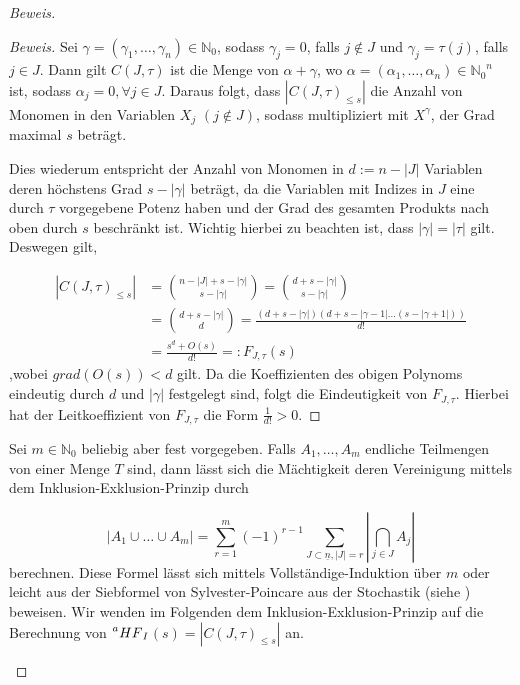 \documentclass{article}
\newcommand*{\indx}[2]{{#1}_{#2}}
\newcommand*{\potx}[2]{{#1}^{#2}}
\newcommand*{\N}{\mathbb{N}_0}
\newcommand*{\hf}[1]{$\prescript{a}{}{HF}_{#1}$}
\begin{document}
\begin{proof}[Beweis]
\begin{compactenum}
\begin{proof}[Beweis]
	Sei $\gamma=(\indx{\gamma}{1},\ldots,\indx{\gamma}{n}) \in \N$, sodass $\indx{\gamma}{j}=0$, falls $j\notin J$ und $\indx{\gamma}{j}=\tau(j)$, falls $j\in J$. Dann gilt $C(J,\tau)$ ist die Menge von $\alpha+\gamma$, wo  $\alpha=(\indx{\alpha}{1},\ldots,\indx{\alpha}{n}) \in \potx{\N}{n}$ ist, sodass $\indx{\alpha}{j}=0, \forall j \in J$. Daraus folgt, dass $\left|\indx{C(J,\tau)}{\leq s}\right|$ die Anzahl von Monomen in den Variablen $\indx{X}{j}$ $(j\notin J)$, sodass multipliziert mit $\potx{X}{\gamma}$, der Grad maximal $s$ beträgt.
	
	Dies wiederum entspricht der Anzahl von Monomen in $d:=n-\left|J\right|$ Variablen deren höchstens Grad $s-\left|\gamma\right|$ beträgt, da die Variablen mit Indizes in $J$ eine durch $\tau$ vorgegebene Potenz haben und der Grad des gesamten Produkts nach oben durch $s$ beschränkt ist. Wichtig hierbei zu beachten ist, dass $\left|\gamma\right|=\left|\tau\right|$ gilt. Deswegen gilt,
	
	\begin{align*}
	\left|\indx{C(J,\tau)}{\leq s}\right|&=\binom{n-\left|J\right|+s-\left|\gamma\right|}{s-\left|\gamma\right|}=\binom{d+s-\left|\gamma\right|}{s-\left|\gamma\right|}\\&
	=\binom{d+s-\left|\gamma\right|}{d}=\frac{(d+s-\left|\gamma\right|)(d+s-\left|\gamma-1\right|\ldots(s-\left|\gamma+1\right|))}{d!}\\&
	=\frac{s^d+O(s)}{d!}=:\indx{F}{J,\tau}(s)
	\end{align*}
	,wobei $grad(O(s))<d$ gilt.	Da die Koeffizienten des obigen Polynoms eindeutig durch $d$  und $|\gamma|$ festgelegt sind, folgt die Eindeutigkeit von $\indx{F}{J,\tau}$. Hierbei hat der Leitkoeffizient von $\indx{F}{J,\tau}$ die Form $\frac{1}{d!}>0$.
\end{proof}

\item Sei $m\in\N$ beliebig aber fest vorgegeben. Falls $\indx{A}{1},\ldots,\indx{A}{m}$ endliche Teilmengen von einer Menge $T$ sind, dann lässt sich die Mächtigkeit deren Vereinigung mittels dem Inklusion-Exklusion-Prinzip durch

\begin{displaymath}
\left|\indx{A}{1}\cup\ldots\cup\indx{A}{m}\right|=\sum\limits_{r=1}^{m}(-1)^{r-1}\sum\limits_{J\subset\underline{n},\left|J\right|=r}{|\bigcap\limits_{j\in J}\indx{A}{j}|}
\end{displaymath}
berechnen. Diese Formel lässt sich mittels Vollständige-Induktion über $m$ oder leicht aus der Siebformel von Sylvester-Poincare aus der Stochastik (siehe \cite{Kamps17}) beweisen. Wir wenden im Folgenden dem Inklusion-Exklusion-Prinzip auf die Berechnung von \hf{I}$(s)=\left|\indx{C(J,\tau)}{\leq s}\right|$ an.


\end{compactenum}
\end{proof}
\end{document}
